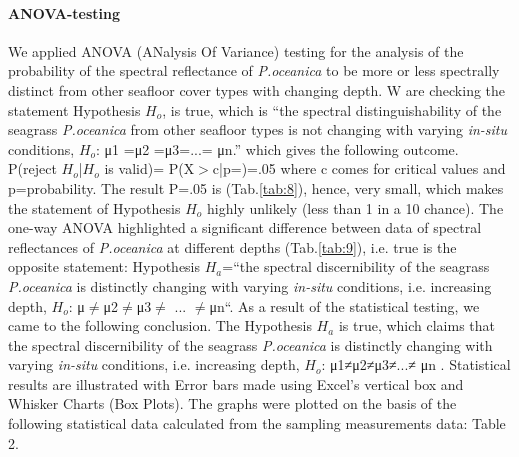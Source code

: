 \documentclass[11pt]{article}
\begin{document}
\paragraph{ANOVA-testing}
We applied \ac{ANOVA} (ANalysis Of Variance) testing for the analysis of the probability of the
spectral reflectance of \textit{P.oceanica} to be more or less spectrally distinct from other seafloor cover
types with changing depth. W are checking the statement Hypothesis $H_o$, is true, which is “the
spectral distinguishability of the seagrass \textit{P.oceanica} from other seafloor types is not changing with
varying \textit{in-situ} conditions, $H_o$: μ1 =μ2 =μ3=...= μn.” which gives the following outcome.
P(reject $H_o$|$H_o$ is valid)= P(X$>$c|p=)=.05
where c comes for critical values and p=probability.
The result P=.05 is (Tab.\ref{tab:8}), hence, very small, which makes the statement of Hypothesis $H_o$ highly unlikely
(less than 1 in a 10 chance). The one-way \ac{ANOVA} highlighted a significant difference between data
of spectral reflectances of \textit{P.oceanica} at different depths (Tab.\ref{tab:9}), i.e. true is the opposite statement:
Hypothesis $H_a$=“the spectral discernibility of the seagrass \textit{P.oceanica} is distinctly changing with
varying \textit{in-situ} conditions, i.e. increasing depth, $H_o$: μ$\neq$μ2$\neq$μ3$\neq$ ... $\neq$μn“.
As a result of the statistical testing, we came to the following conclusion.
The Hypothesis $H_a$ is true, which claims that the spectral discernibility of the seagrass \textit{P.oceanica} is
distinctly changing with varying \textit{in-situ} conditions, i.e. increasing depth, $H_o$: μ1≠μ2≠μ3≠...≠ μn .
Statistical results are illustrated with Error bars made using Excel's vertical box and Whisker Charts
(Box Plots).
The graphs were plotted on the basis of the following statistical data calculated from the sampling
measurements data: Table 2.
\end{document}
